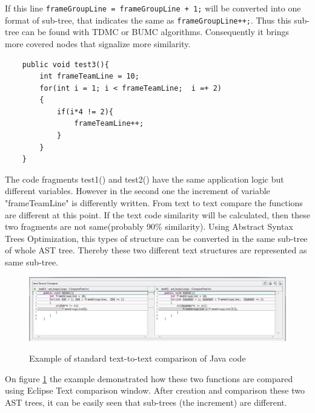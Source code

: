 \documentclass{report}
\begin{document}
If this line \texttt{frameGroupLine = frameGroupLine + 1;} will be converted into one format of sub-tree, that indicates the same as \texttt{frameGroupLine++;}. Thus this sub-tree can be found with TDMC or BUMC algorithms. Consequently it brings more covered nodes that signalize more similarity. 

\begin{lstlisting}
	public void test3(){
		int frameTeamLine = 10;
		for(int i = 1; i < frameTeamLine;  i =+ 2)
		{
			if(i*4 != 2){ 
				frameTeamLine++;
			}
		}
	}
\end{lstlisting}

The code fragments test1() and test2() have the same application logic but different variables. However in the second one the increment of variable "frameTeamLine" is differently written. From text to text compare the functions are different at this point. If the text code similarity will be calculated, then these two fragments are not same(probably 90\% similarity). Using Abstract Syntax Trees Optimization, this types of structure can be converted in the same sub-tree of whole AST tree. Thereby these two different text structures are represented as same sub-tree. 

\vspace{4mm}

\begin{figure}[h]
  \centering
  \includegraphics[width=1.00\textwidth]{Figures/AST-optimization/text-to-text-compare}\\[0.1cm]
  \caption[Text to text comparison example]{Example of standard text-to-text comparison of Java code}
  \label{fig:text-to-text-compare}
\end{figure}

On figure \ref{fig:text-to-text-compare} the example demonstrated how these two functions are compared using Eclipse Text comparison window. After creation and comparison these two AST trees, it can be easily seen that sub-trees (the increment) are different.
\end{document}
